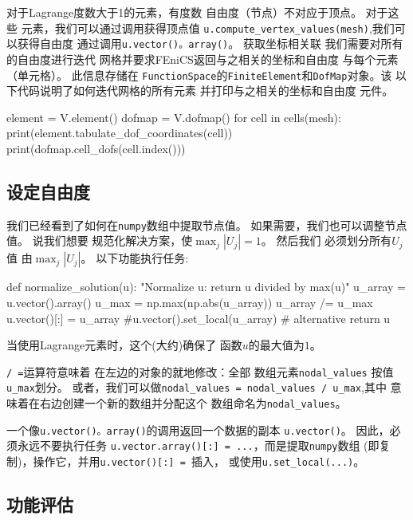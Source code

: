 对于Lagrange度数大于1的元素，有度数
自由度（节点）不对应于顶点。 对于这些
元素，我们可以通过调用获得顶点值
\verb!u.compute_vertex_values(mesh)!,我们可以获得自由度
通过调用\texttt{u.vector()。array()}。 获取坐标相关联
我们需要对所有的自由度进行迭代
网格并要求FEniCS返回与之相关的坐标和自由度
与每个元素（单元格）。 此信息存储在
\texttt{FunctionSpace}的\texttt{FiniteElement}和\texttt{DofMap}对象。该
以下代码说明了如何迭代网格的所有元素
并打印与之相关的坐标和自由度
元件。

\begin{python}
element = V.element()
dofmap = V.dofmap()
for cell in cells(mesh):
    print(element.tabulate_dof_coordinates(cell))
    print(dofmap.cell_dofs(cell.index()))
\end{python}

\subsection{设定自由度}

我们已经看到了如何在\texttt{numpy}数组中提取节点值。
如果需要，我们也可以调整节点值。 说我们想要
规范化解决方案，使$\max_j |U_j| = 1$。 然后我们
必须划分所有$U_j$值
由$\max_j |U_j|$。 以下功能执行任务:

\begin{python}
def normalize_solution(u):
    "Normalize u: return u divided by max(u)"
    u_array = u.vector().array()
    u_max = np.max(np.abs(u_array))
    u_array /= u_max
    u.vector()[:] = u_array
    #u.vector().set_local(u_array)  # alternative
    return u
\end{python}
当使用Lagrange元素时，这个(大约)确保了
函数$u$的最大值为$1$。

\texttt{/ =}运算符意味着
在左边的对象的就地修改：全部
数组元素\verb!nodal_values! 按值\verb!u_max!划分。
或者，我们可以做\verb!nodal_values = nodal_values / u_max!,其中
意味着在右边创建一个新的数组并分配这个
数组命名为\verb!nodal_values!。

\begin{notice}[操纵自由度时要小心]
一个像\texttt{u.vector()。array()}的调用返回一个数据的副本
\texttt{u.vector()}。 因此，必须永远不要执行任务
\texttt{u.vector.array()[:] = ...}，而是提取\texttt{numpy}数组
(即复制)，操作它，并用\texttt{u.vector()[:] = }插入，
或使用\verb!u.set_local(...)!。
\end{notice}

\subsection{功能评估}

